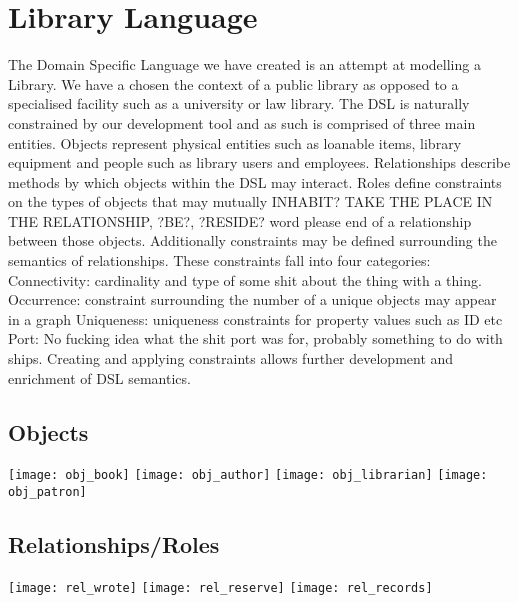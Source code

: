 \section{Library Language}
The Domain Specific Language we have created is an attempt at modelling a Library. We have a chosen the context of a public library as opposed to a specialised facility such as a university or law library. The DSL is naturally constrained by our development tool and as such  is comprised of three main entities. Objects represent physical entities such as loanable items, library equipment and people such as library users and employees. Relationships describe methods by which objects within the DSL may interact. Roles define constraints on the types of objects that may mutually INHABIT? TAKE THE PLACE IN THE RELATIONSHIP, ?BE?, ?RESIDE? word please  end of a relationship between those objects. Additionally constraints may be defined surrounding the semantics of relationships. These constraints fall into four categories:
Connectivity: cardinality and type of some shit about the thing with a thing. 
Occurrence: constraint surrounding the number of a unique objects may appear in a graph
Uniqueness: uniqueness constraints for property values such as ID etc
Port: No fucking idea what the shit port was for, probably something to do with ships.
Creating and applying constraints allows further development and enrichment of DSL semantics.  
\subsection{Objects}
\texttt{[image: obj\_book]}
\texttt{[image: obj\_author]}
\texttt{[image: obj\_librarian]}
\texttt{[image: obj\_patron]}

\subsection{Relationships/Roles}
\texttt{[image: rel\_wrote]}
\texttt{[image: rel\_reserve]}
\texttt{[image: rel\_records]}